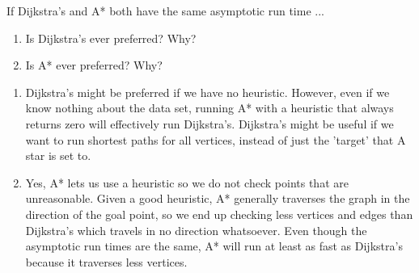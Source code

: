 
\question 
If Dijkstra’s and A* both have the same asymptotic run time ...\\
\begin{enumerate}
\item Is Dijkstra’s ever preferred? Why?
\item Is A* ever preferred? Why?
\end{enumerate}

\begin{solution}[1in]
\begin{enumerate}
\item Dijkstra’s might be preferred if we have no heuristic. However, even if we know nothing about the data set, running A* with a heuristic that always returns zero will effectively run Dijkstra’s. Dijkstra's might be useful if we want to run shortest paths for all vertices, instead of just the 'target' that A star is set to.
\item Yes, A* lets us use a heuristic so we do not check points that are unreasonable. Given a good heuristic, A* generally traverses the graph in the direction of the goal point, so we end up checking less vertices and edges than Dijkstra’s which travels in no direction whatsoever. Even though the asymptotic run times are the same, A* will run at least as fast as Dijkstra’s because it traverses less vertices.
\end{enumerate}
\end{solution}
